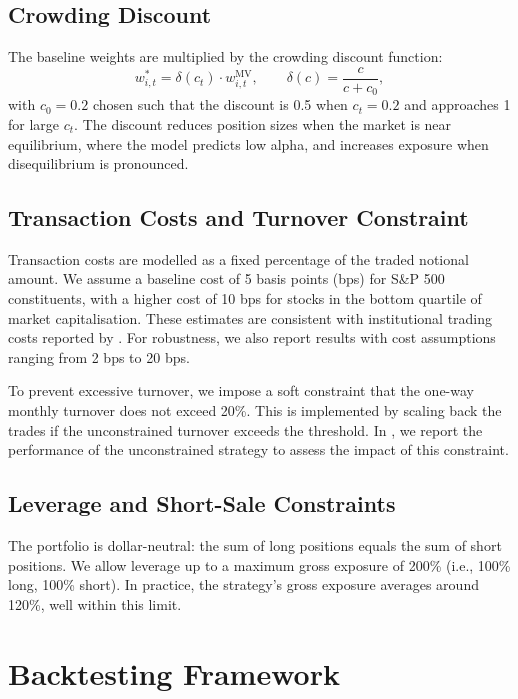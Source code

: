 \subsection{Crowding Discount}

The baseline weights are multiplied by the crowding discount function:
\begin{equation}
    w_{i,t}^* = \delta(c_t) \cdot w_{i,t}^{\mathrm{MV}}, \qquad \delta(c) =
    \frac{c}{c + c_0},
    \label{eq:emp-crowding-discount}
\end{equation}
with $c_0 = 0.2$ chosen such that the discount is 0.5 when $c_t = 0.2$ and
approaches 1 for large $c_t$. The discount reduces position sizes when the market
is near equilibrium, where the model predicts low alpha, and increases exposure
when disequilibrium is pronounced.

\subsection{Transaction Costs and Turnover Constraint}

Transaction costs are modelled as a fixed percentage of the traded notional
amount. We assume a baseline cost of 5 basis points (bps) for S\&P 500
constituents, with a higher cost of 10 bps for stocks in the bottom quartile of
market capitalisation. These estimates are consistent with institutional trading
costs reported by \citep{frazziniisraelmoskowitz2018}. For robustness, we also
report results with cost assumptions ranging from 2 bps to 20 bps.

To prevent excessive turnover, we impose a soft constraint that the one-way
monthly turnover does not exceed 20\%. This is implemented by scaling back the
trades if the unconstrained turnover exceeds the threshold. In
, we report the performance of the unconstrained strategy
to assess the impact of this constraint.

\subsection{Leverage and Short-Sale Constraints}

The portfolio is dollar-neutral: the sum of long positions equals the sum of short
positions. We allow leverage up to a maximum gross exposure of 200\% (i.e., 100\%
long, 100\% short). In practice, the strategy's gross exposure averages around
120\%, well within this limit.


\section{Backtesting Framework}
\label{sec:emp-backtest}

